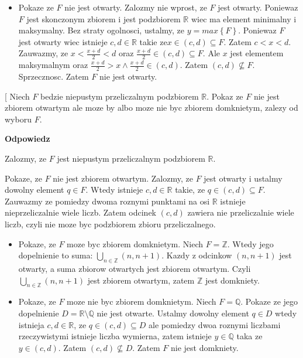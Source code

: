 \documentclass{article}
\makeatletter
\def\myitem{%
   \@ifnextchar[ \@myitem{\@noitemargtrue\@myitem[\@itemlabel]}}
\def\@myitem[#1]{\item[#1]\mbox{}\\}
\makeatother
\begin{document}
\begin{enumerate}[align=left]
\begin{itemize}
            \item Pokaze ze $F$ nie jest otwarty. Zalozmy nie wprost, ze $F$ jest otwarty. Poniewaz $F$ jest skonczonym zbiorem i jest podzbiorem $\mathbb{R}$ wiec ma element minimalny i maksymalny. Bez straty ogolnosci, ustalmy, ze $y = max \left\{ F \right\}$. Poniewaz $F$ jest otwarty wiec istnieje $c,d \in \mathbb{R}$ takie ze$x \in (c,d) \subseteq F$. Zatem $c < x < d$. Zauwazmy, ze $x < \frac{x+d}{2} < d$ oraz $ \frac{x + d}{2} \in (c,d) \subseteq F$. Ale $x$ jest elementem maksymalnym oraz $ \frac{x+d}{2} > x \land  \frac{x+d}{2} \in (c,d)$. Zatem $(c,d) \not\subseteq F$. Sprzecznosc. Zatem $F$ nie jest otwarty. 

        \end{itemize}


        \myitem Niech $F$ bedzie niepustym przeliczalnym podzbiorem $\mathbb{R}$. Pokaz ze $F$ nie jest zbiorem otwartym  ale moze by albo moze nie byc zbiorem domknietym, zalezy od wyboru $F$.
       
       \textbf{Odpowiedz}

       Zalozmy, ze $F$ jest niepustym przeliczalnym podzbiorem $\mathbb{R}$. 
       
       Pokaze, ze $F$ nie jest zbiorem otwartym. Zalozmy, ze $F$ jest otwarty i ustalmy dowolny element $q \in F$. Wtedy istnieje $c,d \in \mathbb{R}$ takie, ze $q \in (c,d) \subseteq F$. Zauwazmy ze pomiedzy dwoma roznymi punktami na osi $ \mathbb{R}$ istnieje nieprzeliczalnie wiele liczb. Zatem odcinek $(c,d)$ zawiera nie przeliczalnie wiele liczb, czyli nie moze byc podzbiorem zbioru przeliczalnego.
        
        \begin{itemize}

            \item Pokaze, ze $F$ moze byc zbiorem domknietym. Niech $F = \mathbb{Z}$. Wtedy jego dopelnienie to suma: $\bigcup\limits_{n \in \mathbb{Z}}(n, n+1)$. Kazdy z odcinkow $(n, n+1)$ jest otwarty, a suma zbiorow otwartych jest zbiorem otwartym. Czyli $\bigcup\limits_{n \in \mathbb{Z}}(n, n+1)$ jest zbiorem otwartym, zatem $\mathbb{Z}$ jest domkniety.
            \item Pokaze, ze $F$ moze nie byc zbiorem domknietym. Niech $F = \mathbb{Q}$. Pokaze ze jego dopelnienie $D = \mathbb{R} \setminus \mathbb{Q}$ nie jest otwarte. Ustalmy dowolny element $q \in D$ wtedy istnieja $c, d \in \mathbb{R}$, ze $q \in (c,d) \subseteq D$ ale pomiedzy dwoa roznymi liczbami rzeczywistymi istnieje liczba wymierna, zatem istnieje $y \in \mathbb{Q}$ taka ze $y \in (c,d)$. Zatem $(c,d) \not\subseteq D$. Zatem $F$ nie jest domkniety.   
        \end{itemize}


\end{enumerate}
\end{document}
